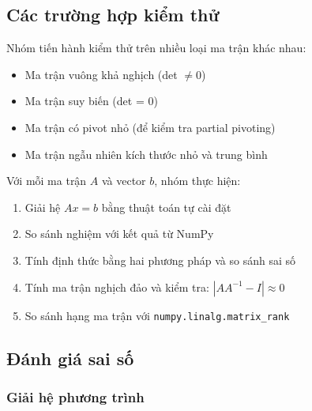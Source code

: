 \subsection{Các trường hợp kiểm thử}

Nhóm tiến hành kiểm thử trên nhiều loại ma trận khác nhau:

\begin{itemize}[topsep=0pt, itemsep=2.5pt, leftmargin=1.5cm]
    \item Ma trận vuông khả nghịch (det $\neq 0$)
    \item Ma trận suy biến (det = 0)
    \item Ma trận có pivot nhỏ (để kiểm tra partial pivoting)
    \item Ma trận ngẫu nhiên kích thước nhỏ và trung bình
\end{itemize}

Với mỗi ma trận $A$ và vector $b$, nhóm thực hiện:
\begin{enumerate}[topsep=0pt, itemsep=2.5pt, leftmargin=1.5cm]
    \item Giải hệ $Ax = b$ bằng thuật toán tự cài đặt
    \item So sánh nghiệm với kết quả từ NumPy
    \item Tính định thức bằng hai phương pháp và so sánh sai số
    \item Tính ma trận nghịch đảo và kiểm tra: $|AA^{-1} - I| \approx 0$
    \item So sánh hạng ma trận với \texttt{numpy.linalg.matrix\_rank}
\end{enumerate}

\subsection{Đánh giá sai số}

\subsubsection{Giải hệ phương trình}

